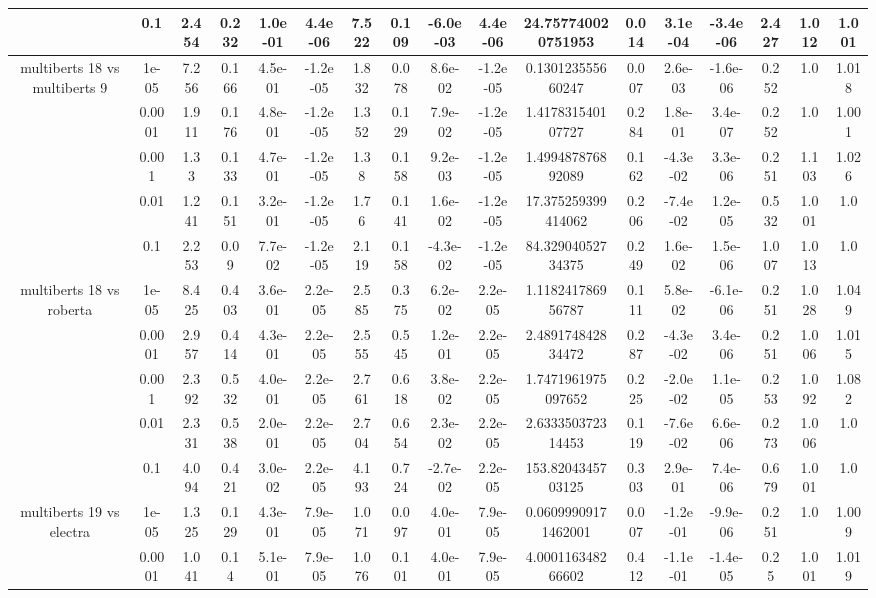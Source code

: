 \begin{tabular}{|c|c|c|c|c|c|c|c|c|c|c|c|c|c|c|c|c|}
 & 0.1 & 2.454 & 0.232 & 1.0e-01 & 4.4e-06 & 7.522 & 0.109 & -6.0e-03 & 4.4e-06 & 24.757740020751953 & 0.014 & 3.1e-04 & -3.4e-06 & 2.427 & 1.012 & 1.001 \\
\hline
\multirow{5}{*}{multiberts 18 vs multiberts 9} & 1e-05 & 7.256 & 0.166 & 4.5e-01 & -1.2e-05 & 1.832 & 0.078 & 8.6e-02 & -1.2e-05 & 0.130123555660247 & 0.007 & 2.6e-03 & -1.6e-06 & 0.252 & 1.0 & 1.018 \\
 & 0.0001 & 1.911 & 0.176 & 4.8e-01 & -1.2e-05 & 1.352 & 0.129 & 7.9e-02 & -1.2e-05 & 1.417831540107727 & 0.284 & 1.8e-01 & 3.4e-07 & 0.252 & 1.0 & 1.001 \\
 & 0.001 & 1.33 & 0.133 & 4.7e-01 & -1.2e-05 & 1.38 & 0.158 & 9.2e-03 & -1.2e-05 & 1.499487876892089 & 0.162 & -4.3e-02 & 3.3e-06 & 0.251 & 1.103 & 1.026 \\
 & 0.01 & 1.241 & 0.151 & 3.2e-01 & -1.2e-05 & 1.76 & 0.141 & 1.6e-02 & -1.2e-05 & 17.375259399414062 & 0.206 & -7.4e-02 & 1.2e-05 & 0.532 & 1.001 & 1.0 \\
 & 0.1 & 2.253 & 0.09 & 7.7e-02 & -1.2e-05 & 2.119 & 0.158 & -4.3e-02 & -1.2e-05 & 84.32904052734375 & 0.249 & 1.6e-02 & 1.5e-06 & 1.007 & 1.013 & 1.0 \\
\hline
\multirow{5}{*}{multiberts 18 vs roberta } & 1e-05 & 8.425 & 0.403 & 3.6e-01 & 2.2e-05 & 2.585 & 0.375 & 6.2e-02 & 2.2e-05 & 1.118241786956787 & 0.111 & 5.8e-02 & -6.1e-06 & 0.251 & 1.028 & 1.049 \\
 & 0.0001 & 2.957 & 0.414 & 4.3e-01 & 2.2e-05 & 2.555 & 0.545 & 1.2e-01 & 2.2e-05 & 2.489174842834472 & 0.287 & -4.3e-02 & 3.4e-06 & 0.251 & 1.006 & 1.015 \\
 & 0.001 & 2.392 & 0.532 & 4.0e-01 & 2.2e-05 & 2.761 & 0.618 & 3.8e-02 & 2.2e-05 & 1.7471961975097652 & 0.225 & -2.0e-02 & 1.1e-05 & 0.253 & 1.092 & 1.082 \\
 & 0.01 & 2.331 & 0.538 & 2.0e-01 & 2.2e-05 & 2.704 & 0.654 & 2.3e-02 & 2.2e-05 & 2.633350372314453 & 0.119 & -7.6e-02 & 6.6e-06 & 0.273 & 1.006 & 1.0 \\
 & 0.1 & 4.094 & 0.421 & 3.0e-02 & 2.2e-05 & 4.193 & 0.724 & -2.7e-02 & 2.2e-05 & 153.8204345703125 & 0.303 & 2.9e-01 & 7.4e-06 & 0.679 & 1.001 & 1.0 \\
\hline
\multirow{5}{*}{multiberts 19 vs electra } & 1e-05 & 1.325 & 0.129 & 4.3e-01 & 7.9e-05 & 1.071 & 0.097 & 4.0e-01 & 7.9e-05 & 0.06099909171462001 & 0.007 & -1.2e-01 & -9.9e-06 & 0.251 & 1.0 & 1.009 \\
 & 0.0001 & 1.041 & 0.14 & 5.1e-01 & 7.9e-05 & 1.076 & 0.101 & 4.0e-01 & 7.9e-05 & 4.000116348266602 & 0.412 & -1.1e-01 & -1.4e-05 & 0.25 & 1.001 & 1.019 \\

\end{tabular}
